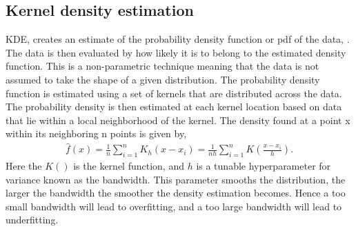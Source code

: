         
        
    
    \subsection{Kernel density estimation}\label{subsec:kde}
        KDE, creates an estimate of the probability density function or pdf of the data, \cite{Latecki}. The data is then evaluated by how likely it is to belong to the estimated density function. This is a non-parametric technique meaning that the data is not assumed to take the shape of a given distribution. The probability density function is estimated using a set of kernels that are distributed across the data. The probability density is then estimated at each kernel location based on data that lie within a local neighborhood of the kernel. The density found at a point x within its neighboring n points is given by, 
        \begin{align}
            \hat{f}(x) = \frac{1}{n} \sum_{i=1}^n K_h(x-x_i)  = \frac{1}{nh} \sum_{i=1}^n K(\frac{x-x_i}{h}).
        \end{align}
        Here the $K()$ is the kernel function, and $h$ is a tunable hyperparameter for variance known as the bandwidth. This parameter smooths the distribution, the larger the bandwidth the smoother the density estimation becomes. Hence a too small bandwidth will lead to overfitting, and a too large bandwidth will lead to underfitting.   
        
